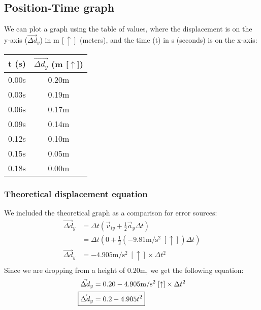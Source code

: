 \documentclass[a4paper,12pt]{article}
\begin{document}
	\subsection{Position-Time graph}
	We can plot a graph using the table of values, where the displacement is on the y-axis ($\vec{\Delta d}_y$) in $\text{m} \,[\uparrow]$ (meters), and the time (t) in s (seconds) is on the x-axis:
	\bigskip
	\bigskip
	\begin{center}
		\begin{tabular}{ |c|c| } 
			\hline
			t (s) & $\vec{\Delta d_y}$ (m [$\uparrow$]) \\ 
			\hline\hline
			0.00s & 0.20m \\
			\hline 
			0.03s & 0.19m \\ 
			\hline
			0.06s & 0.17m \\
			\hline
			0.09s & 0.14m \\
			\hline
			0.12s & 0.10m \\
			\hline
			0.15s & 0.05m \\
			\hline
			0.18s & 0.00m \\
			\hline
		\end{tabular} 
	\end{center}
	\bigskip
	\bigskip
	\bigskip
	\subsubsection{Theoretical displacement equation}
	We included the theoretical graph as a comparison for error sources:
	\begin{align*}
		\vec{\Delta d}_y&=\Delta t\left(\vec{v}_{iy}+\frac{1}{2}\vec{a}_y\Delta t\right)\\
		&=\Delta t\left(0+\frac{1}{2}(-9.81 \text{m}/\text{s}^2\;[\uparrow])\Delta t\right)\\
		\vec{\Delta d}_y&=-4.905 \text{m}/\text{s}^2\;[\uparrow]\times\Delta t^2\\
	\end{align*}
	Since we are dropping from a height of 0.20m, we get the following equation:
	\begin{align*}
		\vec{\Delta d}_y&=0.20-4.905 \text{m}/\text{s}^2\;[\uparrow]\times\Delta t^2\\
		\Aboxed{\vec{\Delta d}_y&=0.2-4.905t^2}
	\end{align*}
	
\end{document}
